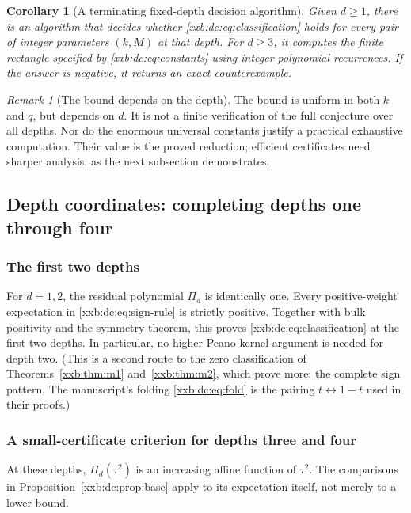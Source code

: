 \documentclass[11pt,a4paper]{article}
\numberwithin{equation}{section}
\newtheorem{corollary}[theorem]{Corollary}
\theoremstyle{definition}
\theoremstyle{remark}
\newtheorem{remark}[theorem]{Remark}
\theoremstyle{plain}
\begin{document}
\begin{corollary}[A terminating fixed-depth decision algorithm]\label{xxb:dc:cor:decision}
Given $d\ge1$, there is an algorithm that decides whether
\eqref{xxb:dc:eq:classification} holds for every pair of integer parameters
$(k,M)$ at that depth.  For $d\ge3$, it computes the finite rectangle
specified by \eqref{xxb:dc:eq:constants} using integer polynomial recurrences.
If the answer is negative, it returns an exact counterexample.
\end{corollary}

\begin{remark}[The bound depends on the depth]\label{xxb:dc:rem:depthdependent}
The bound is uniform in both $k$ and $q$, but depends on $d$.  It is not a
finite verification of the full conjecture over all depths.  Nor do the
enormous universal constants justify a practical exhaustive computation.
Their value is the proved reduction; efficient certificates need sharper
analysis, as the next subsection demonstrates.
\end{remark}

\subsection{Depth coordinates: completing depths one through four}\label{xxb:dc:sec:four}

\subsubsection{The first two depths}
For $d=1,2$, the residual polynomial $\Pi_d$ is identically one.  Every
positive-weight expectation in \eqref{xxb:dc:eq:sign-rule} is strictly
positive.  Together with bulk positivity and the symmetry theorem, this proves
\eqref{xxb:dc:eq:classification} at the first two depths.  In particular, no
higher Peano-kernel argument is needed for depth two.  (This is a second route
to the zero classification of Theorems~\ref{xxb:thm:m1} and~\ref{xxb:thm:m2},
which prove more: the complete sign pattern.  The manuscript's folding
\eqref{xxb:dc:eq:fold} is the pairing $t\leftrightarrow1-t$ used in their
proofs.)

\subsubsection{A small-certificate criterion for depths three and four}
At these depths, $\Pi_d(\tau^2)$ is an increasing affine function of $\tau^2$.
The comparisons in Proposition~\ref{xxb:dc:prop:base} apply to its expectation
itself, not merely to a lower bound.
\end{document}

